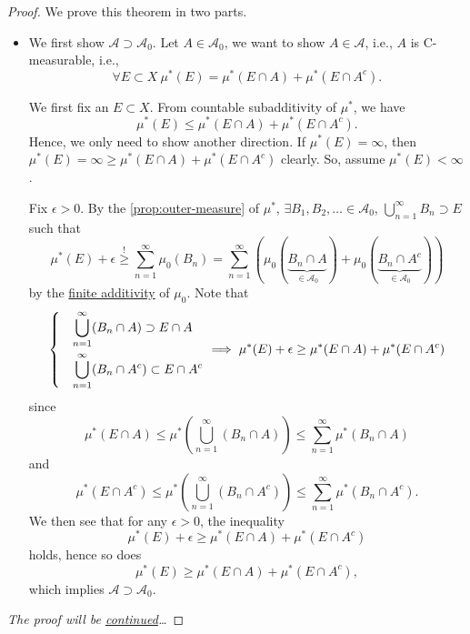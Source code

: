 \begin{proof}\let\qed\relax
	We prove this theorem in two parts.
	\begin{itemize}
		\item We first show \(\mathcal{A} \supset \mathcal{A} _0\). Let \(A\in \mathcal{A} _0\), we want to show \(A\in \mathcal{A} \), i.e.,
		      \(A\) is C-measurable, i.e.,
		      \[
			      \forall E\subset X\ \mu^{*} (E) = \mu^{*} (E\cap A) + \mu^{*} (E\cap A^{c}).
		      \]

		      \par We first fix an \(E\subset X\). From countable subadditivity of \(\mu^{*} \), we have
		      \[
			      \mu^{*} (E) \leq \mu^{*} (E\cap A) + \mu^{*} (E\cap A^{c} ).
		      \]
		      Hence, we only need to show another direction. If \(\mu^{*} (E) = \infty \), then \(\mu^{*} (E) = \infty \geq \mu^{*} (E\cap A) + \mu^{*} (E\cap A^{c} )\) clearly.
		      So, assume \(\mu^{*} (E)<\infty \).

		      \par Fix \(\epsilon >0\). By the \autoref{prop:outer-measure} of \(\mu^{*} \), \(\exists B_1, B_2, \ldots \in \mathcal{A}_0\),
		      \(\bigcup\limits_{n=1}^{\infty} B_{n}\supset E\) such that
		      \[
			      \mu^{*} (E) + \epsilon \overset{\hyperref[prop:outer-measure]{!}}{\geq} \sum\limits_{n=1}^{\infty} \mu_0(B_{n}) = \sum\limits_{n=1}^{\infty} \left(\mu_0(\underbrace{B_{n}\cap A}_{\in \mathcal{A} _0}) + \mu_0(\underbrace{B_{n}\cap A^{c}}_{\in \mathcal{A} _0} )\right)
		      \]
		      by the \hyperref[def:pre-measure-finite-additivity]{finite additivity} of \(\mu_0\). Note that
		      \[
			      \begin{dcases}
				       & \bigcup\limits_{n=1}^{\infty} (B_{n}\cap A)      \supset E\cap A     \\
				       & \bigcup\limits_{n=1}^{\infty} (B_{n}\cap A^{c})  \subset E\cap A^{c}
			      \end{dcases}\implies \mu^{*} (E)+\epsilon \geq \mu^{*} (E\cap A) + \mu^{*} (E\cap A^{c} )
		      \]
		      since
		      \[
			      \mu^{*} (E\cap A)\leq \mu^{*} \left(\bigcup\limits_{n=1}^{\infty} (B_{n}\cap A)\right)\leq \sum\limits_{n=1}^{\infty} \mu^{*} (B_{n}\cap A)
		      \]
		      and
		      \[
			      \mu^{*} (E\cap A^{c} )\leq \mu^{*} \left(\bigcup\limits_{n=1}^{\infty} (B_{n}\cap A^{c})\right) \leq \sum\limits_{n=1}^{\infty} \mu^{*} (B_{n}\cap A^{c} ).
		      \]
		      We then see that for any \(\epsilon >0\), the inequality
		      \[
			      \mu^{*} (E)+\epsilon \geq \mu^{*} (E\cap A) + \mu^{*} (E\cap A^{c} )
		      \]
		      holds, hence so does
		      \[
			      \mu^{*} (E) \geq \mu^{*} (E\cap A) + \mu^{*} (E\cap A^{c} ),
		      \]
		      which implies \(\mathcal{A} \supset \mathcal{A} _0\).
	\end{itemize}
	\emph{The proof will be \hyperref[pf:Hahn-Kolmogorov-Thm-cont]{continued}\ldots}
\end{proof}